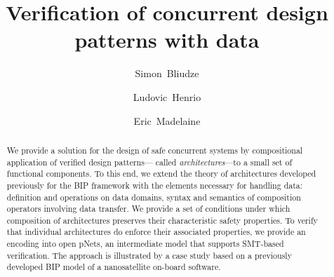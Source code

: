\documentclass{llncs}
\newcommand{\Eric}{\\\hfill\mdash Eric}
\newcommand{\noteEM}[2][color=blue!40, size=\tiny]{\todo[#1]{{#2}\Eric}}
\newcommand{\newCoord}[1]{{\color{blue}#1}}
\newcommand{\mdash}[1][]{---#1}
\begin{document}
\graphicspath{{figures/}}

\title{Verification of concurrent design patterns with data}

\author{%
Simon~Bliudze
\and
Ludovic~Henrio
\and
Eric~Madelaine
}



\maketitle

\begin{abstract}
We provide a solution for the design of safe concurrent systems by
compositional application of verified design patterns\mdash 
called \emph{architectures}\mdash to a small set of functional
components.  To this end, we extend the theory of architectures
developed previously for the BIP framework with the elements necessary
for handling data: definition and operations on data domains, syntax
and semantics of composition operators involving data transfer.
%
\newCoord{We provide a set of conditions under which} %
composition of
architectures preserves their characteristic safety properties.
To verify that individual architectures do enforce their associated
properties, we provide an encoding into open pNets, an intermediate
model  that supports SMT-based verification.
The approach is illustrated by a case
study based on a previously developed BIP model of a nanosatellite
on-board software.

\end{abstract}
\end{document}
